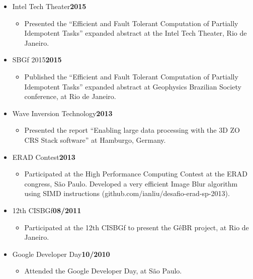 \documentclass[10pt]{article}
\newenvironment{outerlist}[1][\enskip\textbullet]%
        {\begin{itemize}[#1,leftmargin=*]}{\end{itemize}%
         \vspace{-.6\baselineskip}}
\newenvironment{innerlist}[1][\enskip\textbullet]%
        {\begin{itemize}[#1,leftmargin=*,parsep=0pt,itemsep=0pt,topsep=0pt,partopsep=0pt]}
        {\end{itemize}}
\begin{document}
\begin{outerlist}

\item[] Intel Tech Theater\hfill {\bf 2015}
  \begin{innerlist}
  \item Presented the ``Efficient and Fault Tolerant Computation of Partially
  Idempotent Tasks'' expanded abstract at the Intel Tech Theater, Rio de Janeiro.
  \end{innerlist}

\item[] SBGf 2015\hfill {\bf 2015}
  \begin{innerlist}
  \item Published the ``Efficient and Fault Tolerant Computation of Partially
  Idempotent Tasks'' expanded abstract at Geophysics Brazilian Society
  conference, at Rio de Janeiro.
  \end{innerlist}

\item[] Wave Inversion Technology\hfill {\bf 2013}
  \begin{innerlist}
  \item Presented the report ``Enabling large data processing with the 3D ZO CRS
  Stack software'' at Hamburgo, Germany.
  \end{innerlist}

\item[] ERAD Contest\hfill {\bf 2013}
  \begin{innerlist}
  \item Participated at the High Performance Computing Contest at the ERAD
  congress, São Paulo. Developed a very efficient Image Blur algorithm using
  SIMD instructions (github.com/ianliu/desafio-erad-sp-2013).
  \end{innerlist}

\item[] 12th CISBGf\hfill {\bf 08/2011}
  \begin{innerlist}
  \item Participated at the 12th CISBGf to present the GêBR project, at Rio de Janeiro.
  \end{innerlist}

\item[] Google Developer Day\hfill {\bf 10/2010}
  \begin{innerlist}
  \item Attended the Google Developer Day, at São Paulo.
  \end{innerlist}


\end{outerlist}
\end{document}
